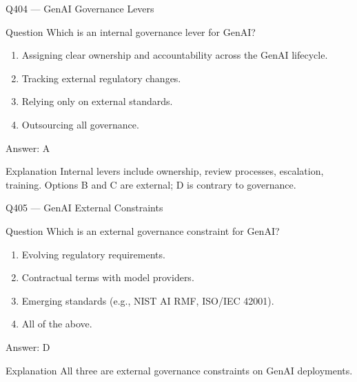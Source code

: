 \documentclass[aspectratio=169,8pt]{beamer}
\begin{document}
	\begin{frame}{Q404 --- GenAI Governance Levers}
		\begin{block}{Question}
			Which is an internal governance lever for GenAI?
			\begin{enumerate}
				\item Assigning clear ownership and accountability across the GenAI lifecycle.
				\item Tracking external regulatory changes.
				\item Relying only on external standards.
				\item Outsourcing all governance.
			\end{enumerate}
		\end{block}
		\begin{exampleblock}{Answer: A}\end{exampleblock}
		\begin{block}{Explanation}
			Internal levers include ownership, review processes, escalation, training. Options B and C are external; D is contrary to governance.
		\end{block}
	\end{frame}
	
	\begin{frame}{Q405 --- GenAI External Constraints}
		\begin{block}{Question}
			Which is an external governance constraint for GenAI?
			\begin{enumerate}
				\item Evolving regulatory requirements.
				\item Contractual terms with model providers.
				\item Emerging standards (e.g., NIST AI RMF, ISO/IEC 42001).
				\item All of the above.
			\end{enumerate}
		\end{block}
		\begin{exampleblock}{Answer: D}\end{exampleblock}
		\begin{block}{Explanation}
			All three are external governance constraints on GenAI deployments.
		\end{block}
	\end{frame}
	
\end{document}
